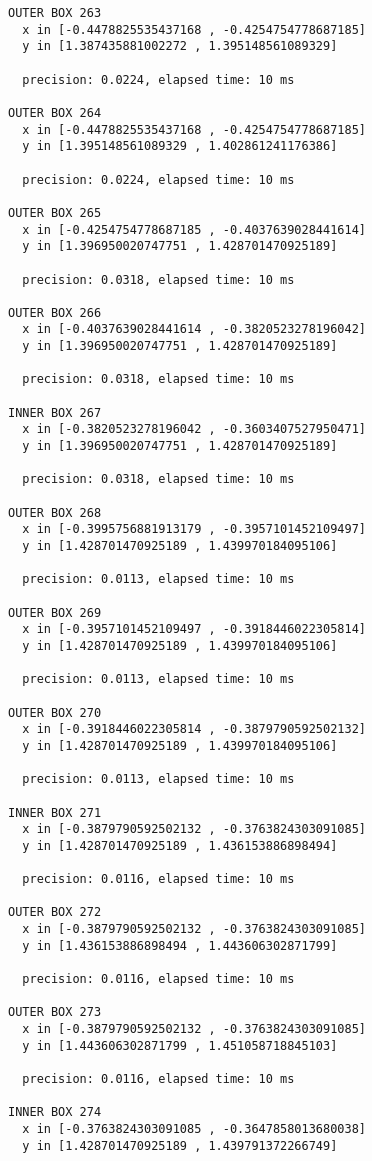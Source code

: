 \begin{verbatim}
OUTER BOX 263
  x in [-0.4478825535437168 , -0.4254754778687185]
  y in [1.387435881002272 , 1.395148561089329]

  precision: 0.0224, elapsed time: 10 ms

OUTER BOX 264
  x in [-0.4478825535437168 , -0.4254754778687185]
  y in [1.395148561089329 , 1.402861241176386]

  precision: 0.0224, elapsed time: 10 ms

OUTER BOX 265
  x in [-0.4254754778687185 , -0.4037639028441614]
  y in [1.396950020747751 , 1.428701470925189]

  precision: 0.0318, elapsed time: 10 ms

OUTER BOX 266
  x in [-0.4037639028441614 , -0.3820523278196042]
  y in [1.396950020747751 , 1.428701470925189]

  precision: 0.0318, elapsed time: 10 ms

INNER BOX 267
  x in [-0.3820523278196042 , -0.3603407527950471]
  y in [1.396950020747751 , 1.428701470925189]

  precision: 0.0318, elapsed time: 10 ms

OUTER BOX 268
  x in [-0.3995756881913179 , -0.3957101452109497]
  y in [1.428701470925189 , 1.439970184095106]

  precision: 0.0113, elapsed time: 10 ms

OUTER BOX 269
  x in [-0.3957101452109497 , -0.3918446022305814]
  y in [1.428701470925189 , 1.439970184095106]

  precision: 0.0113, elapsed time: 10 ms

OUTER BOX 270
  x in [-0.3918446022305814 , -0.3879790592502132]
  y in [1.428701470925189 , 1.439970184095106]

  precision: 0.0113, elapsed time: 10 ms

INNER BOX 271
  x in [-0.3879790592502132 , -0.3763824303091085]
  y in [1.428701470925189 , 1.436153886898494]

  precision: 0.0116, elapsed time: 10 ms

OUTER BOX 272
  x in [-0.3879790592502132 , -0.3763824303091085]
  y in [1.436153886898494 , 1.443606302871799]

  precision: 0.0116, elapsed time: 10 ms

OUTER BOX 273
  x in [-0.3879790592502132 , -0.3763824303091085]
  y in [1.443606302871799 , 1.451058718845103]

  precision: 0.0116, elapsed time: 10 ms

INNER BOX 274
  x in [-0.3763824303091085 , -0.3647858013680038]
  y in [1.428701470925189 , 1.439791372266749]


\end{verbatim}
